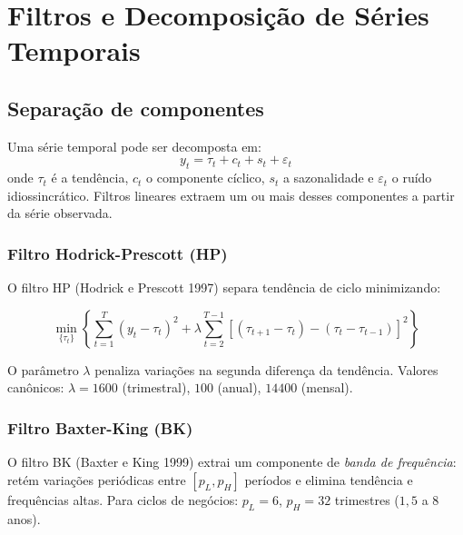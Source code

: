 \chapter{Filtros e Decomposição de Séries Temporais}
\label{cap:filtros}

\section{Separação de componentes}

Uma série temporal pode ser decomposta em:
\[
  y_t = \tau_t + c_t + s_t + \varepsilon_t
\]
onde $\tau_t$ é a tendência, $c_t$ o componente cíclico, $s_t$ a
sazonalidade e $\varepsilon_t$ o ruído idiossincrático. Filtros lineares
extraem um ou mais desses componentes a partir da série observada.

\subsection*{Filtro Hodrick-Prescott (HP)}

O filtro HP (Hodrick e Prescott 1997) separa tendência de ciclo minimizando:

\[
  \min_{\{\tau_t\}} \left\{ \sum_{t=1}^T (y_t - \tau_t)^2
  + \lambda \sum_{t=2}^{T-1} [(\tau_{t+1} - \tau_t) - (\tau_t - \tau_{t-1})]^2 \right\}
\]

O parâmetro $\lambda$ penaliza variações na segunda diferença da tendência.
Valores canônicos: $\lambda = 1600$ (trimestral), $100$ (anual), $14400$ (mensal).

\subsection*{Filtro Baxter-King (BK)}

O filtro BK (Baxter e King 1999) extrai um componente de \emph{banda de
frequência}: retém variações periódicas entre $[p_L, p_H]$ períodos e
elimina tendência e frequências altas. Para ciclos de negócios:
$p_L = 6$, $p_H = 32$ trimestres ($1{,}5$ a $8$ anos).

